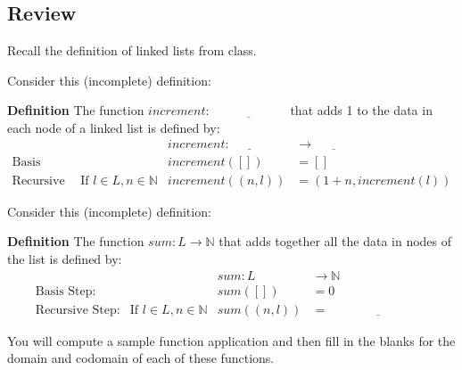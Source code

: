 \documentclass[12pt, oneside]{article}
\begin{document}
\vspace{300pt} \newpage
\subsection*{Review}


Recall the definition of linked lists from class.

Consider this (incomplete) definition:

{\bf Definition} The function $\textit{increment} : \underline{\hspace{6em}}$ 
that adds 1 to the data in each node of a linked list is defined by:
\[
\begin{array}{llll}
& & \textit{increment} : \underline{\hspace{3em}} & \to \underline{\hspace{3em}} \\
\textrm{Basis Step:} & & \textit{increment}([]) & = [] \\
\textrm{Recursive Step:} & \textrm{If } l \in L, n \in \mathbb{N} & \textit{increment}((n, l)) & = (1 + n, \textit{increment}(l))
\end{array}
\]

Consider this (incomplete) definition:

{\bf Definition} The function $\textit{sum} : L \to \mathbb{N}$ that adds 
together all the data in nodes of the list is defined by:
\[
\begin{array}{llll}
& & \textit{sum} : L & \to \mathbb{N} \\
\textrm{Basis Step:} & & \textit{sum}([]) & = 0 \\
\textrm{Recursive Step:} & \textrm{If } l \in L, n \in \mathbb{N} & \textit{sum}((n, l)) & = \underline{\hspace{8em}}
\end{array}
\]

You will compute a sample function application and then fill in the 
blanks for the domain and codomain of each of these functions.
\end{document}
